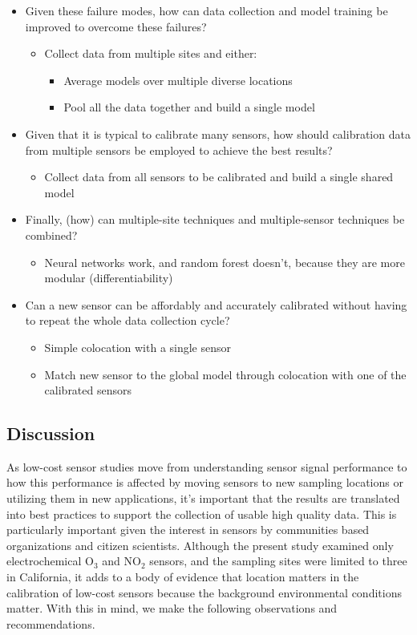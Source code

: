 \documentclass[journal abbreviation, manuscript]{copernicus}
\newcommand{\textus}[1]{$_{\text{#1}}$}
\begin{document}
\begin{itemize}
    \item Given these failure modes, how can data collection and model training be improved to overcome these failures?
      \begin{itemize}
          \item Collect data from multiple sites and either:
          \begin{itemize}
            \item Average models over multiple diverse locations 
            \item Pool all the data together and build a single model
          \end{itemize}
      \end{itemize}
    \item Given that it is typical to calibrate many sensors, how should calibration data from multiple sensors be employed to achieve the best results?
      \begin{itemize}
          \item Collect data from all sensors to be calibrated and build a single shared model
      \end{itemize}
    \item Finally, (how) can multiple-site techniques and multiple-sensor techniques be combined?
      \begin{itemize}
         \item Neural networks work, and random forest doesn’t, because they are more modular (differentiability)
      \end{itemize}
    \item Can a new sensor can be affordably and accurately calibrated without having to repeat the whole data collection cycle?
      \begin{itemize}
          \item Simple colocation with a single sensor
          \item Match new sensor to the global model through colocation with one of the calibrated sensors
      \end{itemize}
\end{itemize}
\fi

\subsection{Discussion}

As low-cost sensor studies move from understanding sensor signal performance to how this performance is affected by moving sensors to new sampling locations or utilizing them in new applications, it’s important that the results are translated into best practices to support the collection of usable high quality data. This is particularly important given the interest in sensors by communities based organizations and citizen scientists. Although the present study examined only electrochemical O\textus{3} and NO\textus{2} sensors, and the sampling sites were limited to three in California, it adds to a body of evidence that location matters in the calibration of low-cost sensors because the background environmental conditions matter.  With this in mind, we make the following observations and recommendations.
\end{document}
